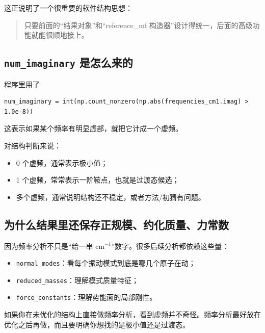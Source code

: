 \documentclass[UTF8,11pt,fontset=fandol]{ctexbook}
\begin{document}
这正说明了一个很重要的软件结构思想：
\begin{quote}
只要前面的“结果对象”和“reference\_mf 构造器”设计得统一，后面的高级功能就能很顺地接上。
\end{quote}

\subsection*{\texttt{num\_imaginary} 是怎么来的}

程序里用了
\begin{lstlisting}[style=pythonstyle]
num_imaginary = int(np.count_nonzero(np.abs(frequencies_cm1.imag) > 1.0e-8))
\end{lstlisting}

这表示如果某个频率有明显虚部，就把它计成一个虚频。

对结构判断来说：
\begin{itemize}
  \item 0 个虚频，通常表示极小值；
  \item 1 个虚频，常常表示一阶鞍点，也就是过渡态候选；
  \item 多个虚频，通常说明结构还不稳定，或者方法/初猜有问题。
\end{itemize}

\subsection*{为什么结果里还保存正规模、约化质量、力常数}

因为频率分析不只是“给一串 cm\(^{-1}\)”数字。很多后续分析都依赖这些量：
\begin{itemize}
  \item \texttt{normal\_modes}：看每个振动模式到底是哪几个原子在动；
  \item \texttt{reduced\_masses}：理解模式质量特征；
  \item \texttt{force\_constants}：理解势能面的局部刚性。
\end{itemize}

\begin{warnbox}[实践提醒]
如果你在未优化的结构上直接做频率分析，看到虚频并不奇怪。频率分析最好放在优化之后再做，而且要明确你想找的是极小值还是过渡态。
\end{warnbox}
\end{document}
